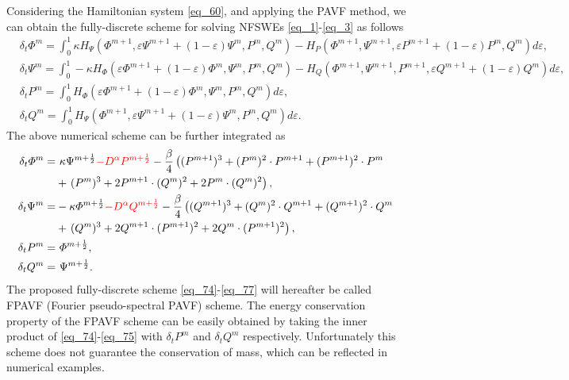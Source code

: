 \documentclass[preprint,compress,3p,10pt,fleqn]{elsarticle}
\numberwithin{equation}{section}
\begin{document}
Considering the Hamiltonian system \eqref{eq_60}, and applying the PAVF method, we can obtain the fully-discrete scheme for solving NFSWEs \eqref{eq_1}-\eqref{eq_3} as follows
\begin{align}
&\delta_{t} \varPhi^{m}\!\!=\!\!\int_{0}^{1}\!\!\kappa H_{\Psi}\!\!\left(\varPhi^{m+1}, \varepsilon \Psi^{m+1}\!\!+\!(1\!\!-\!\varepsilon) \Psi^{m}, P^{m}, Q^{m}\right)\!\!-\!\!H_{P}\!\!\left(\varPhi^{m+1}, \Psi^{m+1}, \varepsilon P^{m+1}\!\!+\!(1\!\!-\!\varepsilon) P^{m}, Q^{m}\right)\!d \varepsilon,\label{eq_70}\\
&\delta_{t} \Psi^{m}\!\!=\!\!\int_{0}^{1}\!\!\!\!-\kappa H_{\varPhi}\!\!\left(\varepsilon \varPhi^{m+1}\!\!+\!(1\!\!-\!\varepsilon) \varPhi^{m}, \Psi^{m}, P^{m}, Q^{m}\right)\!\!-\!\!H_{Q}\!\!\left(\varPhi^{m+1}, \Psi^{m+1}, P^{m+1}, \varepsilon Q^{m+1}\!\!+\!(1\!\!-\!\varepsilon) Q^{m}\right)\!d\varepsilon,\label{eq_71}\\
&\delta_{t} P^{m}\!=\!\int_{0}^{1}\!H_{\varPhi}\left(\varepsilon \varPhi^{m+1}\!+\!(1\!-\!\varepsilon) \varPhi^{m}, \Psi^{m}, P^{m}, Q^{m}\right) d \varepsilon,\label{eq_72}\\
&\delta_{t} Q^{m}\!=\!\int_{0}^{1}\!H_{\Psi}\left(\varPhi^{m+1}, \varepsilon \Psi^{m+1}\!+\!(1\!-\!\varepsilon) \Psi^{m}, P^{m}, Q^{m}\right) d \varepsilon.\label{eq_73}
\end{align}
The above numerical scheme can be further integrated as
\begin{align}
\delta_{t} \varPhi^{m}=&~\kappa \Psi^{m+\frac{1}{2}}\textcolor[rgb]{1.00,0.00,0.00}{-D^{\alpha} P^{m+\frac{1}{2}}}-\frac{\beta}{4}\left( (P^{m+1})^3+ (P^{m})^{2}\cdot P^{m+1}+(P^{m+1})^{2}\cdot P^{m}\right.\nonumber\\
	&+\left. (P^{m})^{3}+2 P^{m+1}\cdot (Q^{m})^{2}+2 P^{m}\cdot (Q^{m})^{2}\right),\label{eq_74}\\
\delta_{t} \Psi^{m}=&-\kappa \varPhi^{m+\frac{1}{2}}\textcolor[rgb]{1.00,0.00,0.00}{-D^{\alpha} Q^{m+\frac{1}{2}}}-\frac{\beta}{4}\left( (Q^{m+1})^3+ (Q^{m})^{2}\cdot Q^{m+1}+(Q^{m+1})^{2}\cdot Q^{m}\right.\nonumber\\
	&+\left. (Q^{m})^{3}+2 Q^{m+1}\cdot (P^{m+1})^{2}+2 Q^{m}\cdot (P^{m+1})^{2}\right),\label{eq_75}\\
\delta_{t} P^{m}=&~\varPhi^{m+\frac{1}{2}},\label{eq_76}\\
\delta_{t} Q^{m}=&~\Psi^{m+\frac{1}{2}}.\label{eq_77}
\end{align}
The proposed fully-discrete scheme \eqref{eq_74}-\eqref{eq_77} will hereafter be called FPAVF (Fourier pseudo-spectral PAVF) scheme. The energy conservation property of the FPAVF scheme can be easily obtained by taking the inner product of \eqref{eq_74}-\eqref{eq_75} with $\delta_t P^{m}$ and $\delta_t Q^{m}$ respectively. Unfortunately this scheme does not guarantee the conservation of mass, which can be reflected in numerical examples.
\end{document}
